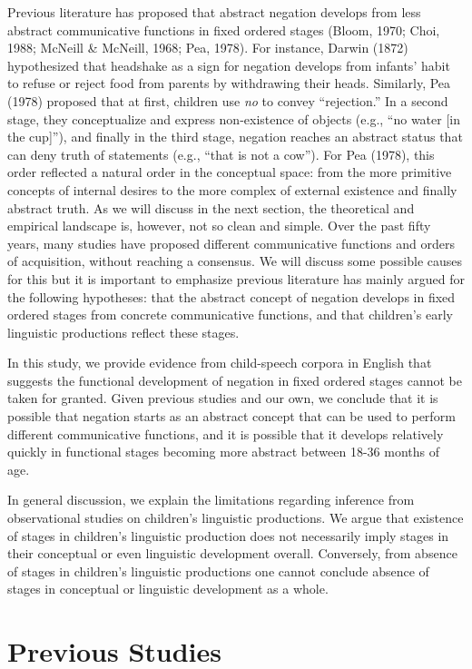 \documentclass[
  english,
  man,floatsintext]{apa6}
\begin{document}
Previous literature has proposed that abstract negation develops from less abstract communicative functions in fixed ordered stages (Bloom, 1970; Choi, 1988; McNeill \& McNeill, 1968; Pea, 1978). For instance, Darwin (1872) hypothesized that headshake as a sign for negation develops from infants' habit to refuse or reject food from parents by withdrawing their heads. Similarly, Pea (1978) proposed that at first, children use \emph{no} to convey ``rejection.'' In a second stage, they conceptualize and express non-existence of objects (e.g., ``no water {[}in the cup{]}''), and finally in the third stage, negation reaches an abstract status that can deny truth of statements (e.g., ``that is not a cow''). For Pea (1978), this order reflected a natural order in the conceptual space: from the more primitive concepts of internal desires to the more complex of external existence and finally abstract truth. As we will discuss in the next section, the theoretical and empirical landscape is, however, not so clean and simple. Over the past fifty years, many studies have proposed different communicative functions and orders of acquisition, without reaching a consensus. We will discuss some possible causes for this but it is important to emphasize previous literature has mainly argued for the following hypotheses: that the abstract concept of negation develops in fixed ordered stages from concrete communicative functions, and that children's early linguistic productions reflect these stages.

In this study, we provide evidence from child-speech corpora in English that suggests the functional development of negation in fixed ordered stages cannot be taken for granted. Given previous studies and our own, we conclude that it is possible that negation starts as an abstract concept that can be used to perform different communicative functions, and it is possible that it develops relatively quickly in functional stages becoming more abstract between 18-36 months of age.

In general discussion, we explain the limitations regarding inference from observational studies on children's linguistic productions. We argue that existence of stages in children's linguistic production does not necessarily imply stages in their conceptual or even linguistic development overall. Conversely, from absence of stages in children's linguistic productions one cannot conclude absence of stages in conceptual or linguistic development as a whole.

\hypertarget{previous-studies}{%
\section{Previous Studies}\label{previous-studies}}
\end{document}
